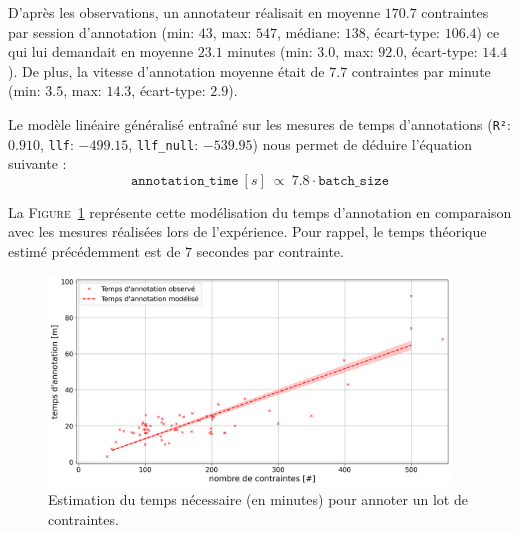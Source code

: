 			D'après les observations, un annotateur réalisait en moyenne $170.7$ contraintes par session d'annotation (min: $43$, max: $547$, médiane: $138$, écart-type: $106.4$) ce qui lui demandait en moyenne $23.1$ minutes (min: $3.0$, max: $92.0$, écart-type: $14.4$).
			De plus, la vitesse d'annotation moyenne était de $7.7$ contraintes par minute (min: $3.5$, max: $14.3$, écart-type: $2.9$).
			
			Le modèle linéaire généralisé entraîné sur les mesures de temps d'annotations (\texttt{R²}: $0.910$, \texttt{llf}: $-499.15$, \texttt{llf\_null}: $-539.95$) nous permet de déduire l'équation suivante :
			\begin{equation}
				\label{equation:4.3.1-ETUDE-COUT-COUTS-TEMPS-ANNOTATION}
				\texttt{annotation\_time}~[s]~
				\propto~7.8 \cdot \texttt{batch\_size}
			\end{equation}
		
			La \textsc{Figure~\ref{figure:4.3.1-ETUDE-COUTS-TEMPS-ANNOTATION-SIMULATION}} représente cette modélisation du temps d'annotation en comparaison avec les mesures réalisées lors de l'expérience.
			Pour rappel, le temps théorique estimé précédemment est de $7$ secondes par contrainte.
			\begin{figure}[!htb]
				\centering
				\includegraphics[width=0.95\textwidth]{figures/etude-temps-annotation-1-modelisation-temps}
				\caption{
					Estimation du temps nécessaire (en minutes) pour annoter un lot de contraintes.
				}
				\label{figure:4.3.1-ETUDE-COUTS-TEMPS-ANNOTATION-SIMULATION}
			\end{figure}
		
